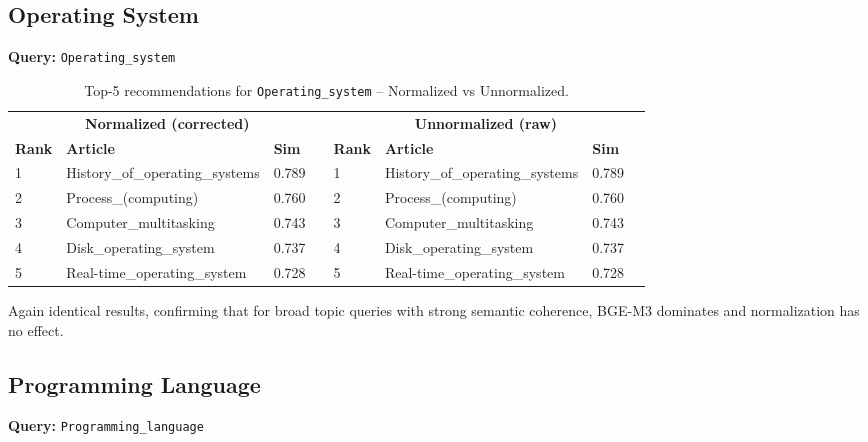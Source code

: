 \documentclass[12pt,a4paper]{article}
\begin{document}
\subsection{Operating System}

\textbf{Query:} \texttt{Operating\_system}

\begin{table}[H]
\centering
\caption{Top-5 recommendations for \texttt{Operating\_system} -- Normalized vs Unnormalized.}
\label{tab:os}
\begin{tabular}{lllr|lllr}
\toprule
\multicolumn{4}{c}{\textbf{Normalized (corrected)}} & \multicolumn{4}{c}{\textbf{Unnormalized (raw)}} \\
\cmidrule(lr){1-4}\cmidrule(lr){5-8}
\textbf{Rank} & \textbf{Article} & \textbf{Sim} & & \textbf{Rank} & \textbf{Article} & \textbf{Sim} \\
\midrule
1 & History\_of\_operating\_systems & 0.789 & & 1 & History\_of\_operating\_systems & 0.789 \\
2 & Process\_(computing) & 0.760 & & 2 & Process\_(computing) & 0.760 \\
3 & Computer\_multitasking & 0.743 & & 3 & Computer\_multitasking & 0.743 \\
4 & Disk\_operating\_system & 0.737 & & 4 & Disk\_operating\_system & 0.737 \\
5 & Real-time\_operating\_system & 0.728 & & 5 & Real-time\_operating\_system & 0.728 \\
\bottomrule
\end{tabular}
\end{table}

Again identical results, confirming that for broad topic queries with strong
semantic coherence, BGE-M3 dominates and normalization has no effect.

\subsection{Programming Language}

\textbf{Query:} \texttt{Programming\_language}
\end{document}
